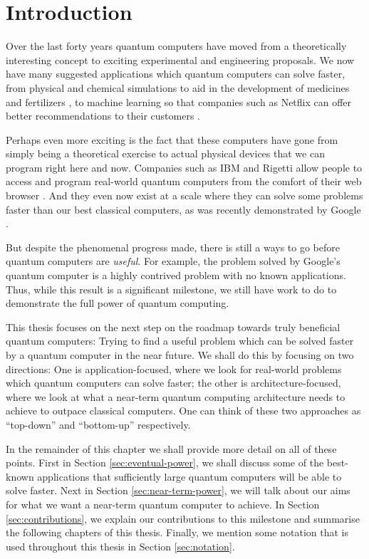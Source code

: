 \chapter{Introduction}

Over the last forty years quantum computers have moved from a theoretically interesting concept to exciting experimental and engineering proposals. We now have many suggested applications which quantum computers can solve faster, from physical and chemical simulations to aid in the development of medicines and fertilizers \cite{berry2019}, to machine learning so that companies such as Netflix can offer better recommendations to their customers \cite{kerenidis2017}.

Perhaps even more exciting is the fact that these computers have gone from simply being a theoretical exercise to actual physical devices that we can program right here and now. Companies such as IBM and Rigetti allow people to access and program real-world quantum computers from the comfort of their web browser \cite{ibm, rigetti}. And they even now exist at a scale where they can solve some problems faster than our best classical computers, as was recently demonstrated by Google \cite{arute2019}.

But despite the phenomenal progress made, there is still a ways to go before quantum computers are \emph{useful}. For example, the problem solved by Google's quantum computer is a highly contrived problem with no known applications. Thus, while this result is a significant milestone, we still have work to do to demonstrate the full power of quantum computing.

This thesis focuses on the next step on the roadmap towards truly beneficial quantum computers: Trying to find a useful problem which can be solved faster by a quantum computer in the near future. We shall do this by focusing on two directions: One is application-focused, where we look for real-world problems which quantum computers can solve faster; the other is architecture-focused, where we look at what a near-term quantum computing architecture needs to achieve to outpace classical computers. One can think of these two approaches as ``top-down'' and ``bottom-up'' respectively.

In the remainder of this chapter we shall provide more detail on all of these points. First in Section \ref{sec:eventual-power}, we shall discuss some of the best-known applications that sufficiently large quantum computers will be able to solve faster. Next in Section \ref{sec:near-term-power}, we will talk about our aims for what we want a near-term quantum computer to achieve. In Section \ref{sec:contributions}, we explain our contributions to this milestone and summarise the following chapters of this thesis. Finally, we mention some notation that is used throughout this thesis in Section \ref{sec:notation}.

